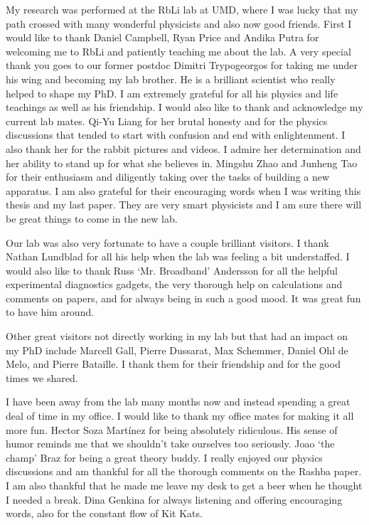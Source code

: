 My research was performed at the RbLi lab at UMD, where I was lucky that my path crossed with many wonderful physicists and also now good friends. First I would like to thank  Daniel Campbell, Ryan Price and Andika Putra for welcoming me to RbLi and patiently teaching me about the lab. A very special thank you goes to our former postdoc Dimitri Trypogeorgos for taking me under his wing and becoming my lab brother. He is a brilliant scientist who really helped to shape my PhD. I am extremely grateful for all his physics and life teachings as well as his friendship. I would also like to thank and acknowledge my current lab mates. Qi-Yu Liang for her brutal honesty and for the physics discussions that tended to start with confusion and end with enlightenment. I also thank her for the rabbit pictures and videos. I admire her determination and her ability to stand up for what she believes in. Mingshu Zhao and Junheng Tao for their enthusiasm and diligently taking over the tasks of building a new apparatus. I am also grateful for their encouraging words when I was writing this thesis and my last paper. They are very smart physicists and I am sure there will be great things to come in the new lab. 

Our lab was also very fortunate to have a couple brilliant visitors. I thank Nathan Lundblad for all his help when the lab was feeling a bit understaffed. I would also like to thank Russ `Mr. Broadband' Andersson for all the helpful experimental diagnostics gadgets, the very thorough help on calculations and comments on papers, and for always being in such a good mood. It was great fun to have him around. 

Other great visitors not directly working in my lab but that had an impact on my PhD include Marcell Gall, Pierre Dussarat, Max Schemmer, Daniel Ohl de Melo, and Pierre Bataille. I thank them for their friendship and for the good times we shared.  

I have been away from the lab many months now and instead spending a great deal of time in my office. I would like to thank my office mates for making it all more fun. Hector Soza Mart\'inez for being absolutely ridiculous. His sense of humor reminds me that we shouldn't take ourselves too seriously. Joao `the champ' Braz for being a great theory buddy. I really enjoyed our physics discussions and am thankful for all the thorough comments on the Rashba paper. I am also thankful that he made me leave my desk to get a beer when he thought I needed a break. Dina Genkina for always listening and offering encouraging words, also for the constant flow of Kit Kats. 

